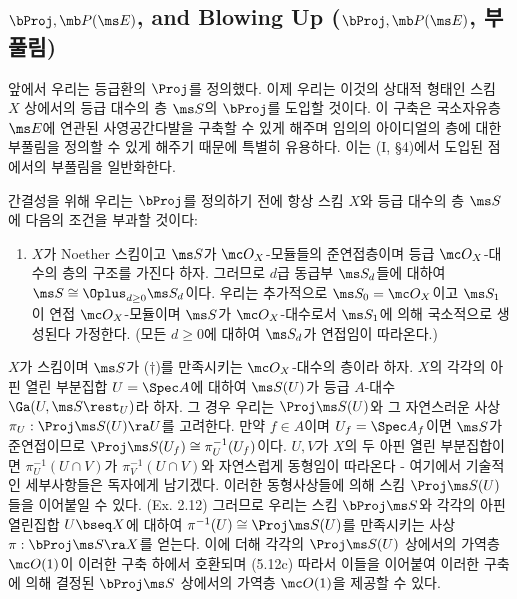 	
	\subsection*{$\bProj,\mb P(\ms E)$, and Blowing Up ($\bProj,\mb P(\ms E)$, 부풀림)}
	앞에서 우리는 등급환의 $\Proj$를 정의했다.
	이제 우리는 이것의 상대적 형태인 스킴 $X$ 상에서의 등급 대수의 층 $\ms S$의 $\bProj$를 도입할 것이다.
	이 구축은 국소자유층 $\ms E$에 연관된 사영공간다발을 구축할 수 있게 해주며
	임의의 아이디얼의 층에 대한 부풀림을 정의할 수 있게 해주기 때문에 특별히 유용하다.
	이는 (I, \S 4)에서 도입된 점에서의 부풀림을 일반화한다.
	
	간결성을 위해 우리는 $\bProj$를 정의하기 전에 항상 스킴 $X$와 등급 대수의 층 $\ms S$에 다음의 조건을 부과할 것이다:\\
	\begin{enumerate}[label=($\dagger$)]
	\item $X$가 Noether 스킴이고 $\ms S$가 $\mc O_X$-모듈들의 준연접층이며 등급 $\mc O_X$-대수의 층의 구조를 가진다 하자.
	그러므로 $d$급 동급부 $\ms S_d$들에 대하여 $\ms S\cong\Oplus_{d\ge 0}\ms S_d$이다.
	우리는 추가적으로 $\ms S_0=\mc O_X$이고 $\ms S_1$이 연접 $\mc O_X$-모듈이며
	$\ms S$가 $\mc O_X$-대수로서 $\ms S_1$에 의해 국소적으로 생성된다 가정한다.
	(모든 $d\ge 0$에 대하여 $\ms S_d$가 연접임이 따라온다.)
	\end{enumerate}
	
	\begin{construction}
	$X$가 스킴이며 $\ms S$가 ($\dag$)를 만족시키는 $\mc O_X$-대수의 층이라 하자.
	$X$의 각각의 아핀 열린 부분집합 $U=\Spec A$에 대하여 $\ms S(U)$가 등급 $A$-대수 $\Ga(U,\ms S\rest_U)$라 하자.
	그 경우 우리는 $\Proj\ms S(U)$와 그 자연스러운 사상 $\pi_U:\Proj\ms S(U)\ra U$를 고려한다.
	만약 $f\in A$이며 $U_f=\Spec A_f$이면 $\ms S$가 준연접이므로 $\Proj\ms S(U_f)\cong\pi_U^{-1}(U_f)$이다.
	$U,V$가 $X$의 두 아핀 열린 부분집합이면 $\pi_U^{-1}(U\cap V)$가 $\pi_V^{-1}(U\cap V)$와 자연스럽게 동형임이 따라온다
	- 여기에서 기술적인 세부사항들은 독자에게 남기겠다.
	이러한 동형사상들에 의해 스킴 $\Proj\ms S(U)$들을 이어붙일 수 있다. (Ex. 2.12)
	그러므로 우리는 스킴 $\bProj\ms S$와 각각의 아핀 열린집합 $U\bseq X$에 대하여 $\pi^{-1}(U)\cong\Proj\ms S(U)$를 만족시키는
	사상 $\pi:\bProj\ms S\ra X$를 얻는다.
	이에 더해 각각의 $\Proj\ms S(U)$ 상에서의 가역층 $\mc O(1)$이 이러한 구축 하에서 호환되며 (5.12c)
	따라서 이들을 이어붙여 이러한 구축에 의해 결정된 $\bProj\ms S$ 상에서의 가역층 $\mc O(1)$을 제공할 수 있다.
	\end{construction}
	
